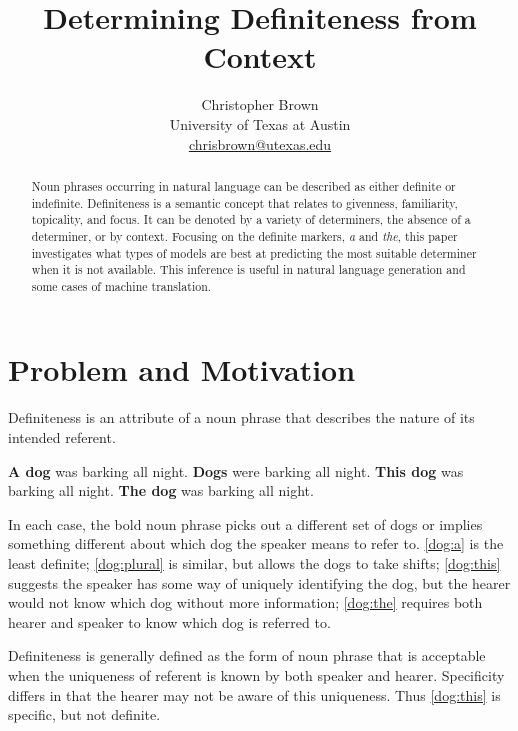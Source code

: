\documentclass[11pt]{article}\usepackage{graphicx, color}
\title{Determining Definiteness from Context}
\author{Christopher Brown\\
University of Texas at Austin\\
\href{mailto:chrisbrown@utexas.edu}{chrisbrown@utexas.edu}}
\date{}
\begin{document}
\maketitle

\begin{abstract}
\noindent
Noun phrases occurring in natural language can be described as either definite or indefinite.
Definiteness is a semantic concept that relates to givenness, familiarity, topicality, and focus.
It can be denoted by a variety of determiners, the absence of a determiner, or by context.
Focusing on the definite markers, \emph{a} and \emph{the}, this paper investigates what types of models are best at predicting the most suitable determiner when it is not available. This inference is useful in natural language generation and some cases of machine translation.
\end{abstract}


\section{Problem and Motivation} %
Definiteness is an attribute of a noun phrase that describes the nature of its intended referent.
\begin{exe}
  \ex \textbf{A dog} was barking all night. \label{dog:a}
  \ex \textbf{Dogs} were barking all night. \label{dog:plural}
  \ex \textbf{This dog} was barking all night. \label{dog:this}
  \ex \textbf{The dog} was barking all night. \label{dog:the}
\end{exe}
In each case, the bold noun phrase picks out a different set of dogs or implies something different about which dog the speaker means to refer to. \eqref{dog:a} is the least definite; \eqref{dog:plural} is similar, but allows the dogs to take shifts; \eqref{dog:this} suggests the speaker has some way of uniquely identifying the dog, but the hearer would not know which dog without more information; \eqref{dog:the} requires both hearer and speaker to know which dog is referred to.

Definiteness is generally defined as the form of noun phrase that is acceptable when the uniqueness of referent is known by both speaker and hearer. Specificity differs in that the hearer may not be aware of this uniqueness. Thus \eqref{dog:this} is specific, but not definite.
\end{document}
